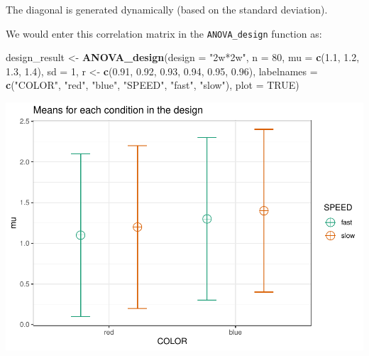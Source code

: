 \documentclass[]{book}
\newenvironment{Shaded}{\begin{snugshade}}{\end{snugshade}}
\newcommand{\DataTypeTok}[1]{\textcolor[rgb]{0.13,0.29,0.53}{#1}}
\newcommand{\DecValTok}[1]{\textcolor[rgb]{0.00,0.00,0.81}{#1}}
\newcommand{\FloatTok}[1]{\textcolor[rgb]{0.00,0.00,0.81}{#1}}
\newcommand{\KeywordTok}[1]{\textcolor[rgb]{0.13,0.29,0.53}{\textbf{#1}}}
\newcommand{\NormalTok}[1]{#1}
\newcommand{\OtherTok}[1]{\textcolor[rgb]{0.56,0.35,0.01}{#1}}
\newcommand{\StringTok}[1]{\textcolor[rgb]{0.31,0.60,0.02}{#1}}
\begin{document}
The diagonal is generated dynamically (based on the standard deviation).
\pagebreak

We would enter this correlation matrix in the \texttt{ANOVA\_design} function as:

\begin{Shaded}
\begin{Highlighting}[]
\NormalTok{design_result <-}\StringTok{ }\KeywordTok{ANOVA_design}\NormalTok{(}\DataTypeTok{design =} \StringTok{"2w*2w"}\NormalTok{,}
                              \DataTypeTok{n =} \DecValTok{80}\NormalTok{,}
                              \DataTypeTok{mu =} \KeywordTok{c}\NormalTok{(}\FloatTok{1.1}\NormalTok{, }\FloatTok{1.2}\NormalTok{, }
                                     \FloatTok{1.3}\NormalTok{, }\FloatTok{1.4}\NormalTok{),}
                              \DataTypeTok{sd =} \DecValTok{1}\NormalTok{,}
\NormalTok{                              r <-}\StringTok{ }\KeywordTok{c}\NormalTok{(}\FloatTok{0.91}\NormalTok{, }\FloatTok{0.92}\NormalTok{, }
                                     \FloatTok{0.93}\NormalTok{, }\FloatTok{0.94}\NormalTok{, }
                                     \FloatTok{0.95}\NormalTok{, }\FloatTok{0.96}\NormalTok{),}
                              \DataTypeTok{labelnames =} \KeywordTok{c}\NormalTok{(}\StringTok{"COLOR"}\NormalTok{, }
                                             \StringTok{"red"}\NormalTok{, }\StringTok{"blue"}\NormalTok{, }
                                             \StringTok{"SPEED"}\NormalTok{, }
                                             \StringTok{"fast"}\NormalTok{, }\StringTok{"slow"}\NormalTok{),}
                              \DataTypeTok{plot =} \OtherTok{TRUE}\NormalTok{)}
\end{Highlighting}
\end{Shaded}

\includegraphics{SuperpowerValidation_files/figure-latex/unnamed-chunk-4-1.pdf}
\end{document}
